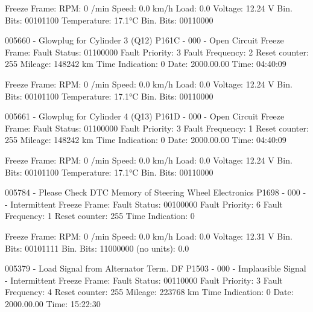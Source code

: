             Freeze Frame:
                    RPM: 0 /min
                    Speed: 0.0 km/h
                    Load: 0.0 %
                    Voltage: 12.24 V
                    Bin. Bits: 00101100
                    Temperature: 17.1°C
                    Bin. Bits: 00110000

005660 - Glowplug for Cylinder 3 (Q12) 
               P161C - 000 - Open Circuit
             Freeze Frame:
                    Fault Status: 01100000
                    Fault Priority: 3
                    Fault Frequency: 2
                    Reset counter: 255
                    Mileage: 148242 km
                    Time Indication: 0
                    Date: 2000.00.00
                    Time: 04:40:09

             Freeze Frame:
                    RPM: 0 /min
                    Speed: 0.0 km/h
                    Load: 0.0 %
                    Voltage: 12.24 V
                    Bin. Bits: 00101100
                    Temperature: 17.1°C
                    Bin. Bits: 00110000

005661 - Glowplug for Cylinder 4 (Q13) 
               P161D - 000 - Open Circuit
             Freeze Frame:
                    Fault Status: 01100000
                    Fault Priority: 3
                    Fault Frequency: 1
                    Reset counter: 255
                    Mileage: 148242 km
                    Time Indication: 0
                    Date: 2000.00.00
                    Time: 04:40:09

             Freeze Frame:
                    RPM: 0 /min
                    Speed: 0.0 km/h
                    Load: 0.0 %
                    Voltage: 12.24 V
                    Bin. Bits: 00101100
                    Temperature: 17.1°C
                    Bin. Bits: 00110000

005784 - Please Check DTC Memory of Steering Wheel Electronics 
               P1698 - 000 -  - Intermittent
             Freeze Frame:
                    Fault Status: 00100000
                    Fault Priority: 6
                    Fault Frequency: 1
                    Reset counter: 255
                    Time Indication: 0

             Freeze Frame:
                    RPM: 0 /min
                    Speed: 0.0 km/h
                    Load: 0.0 %
                    Voltage: 12.31 V
                    Bin. Bits: 00101111
                    Bin. Bits: 11000000
                    (no units): 0.0

005379 - Load Signal from Alternator Term. DF 
               P1503 - 000 - Implausible Signal - Intermittent
             Freeze Frame:
                    Fault Status: 00110000
                    Fault Priority: 3
                    Fault Frequency: 4
                    Reset counter: 255
                    Mileage: 223768 km
                    Time Indication: 0
                    Date: 2000.00.00
                    Time: 15:22:30

